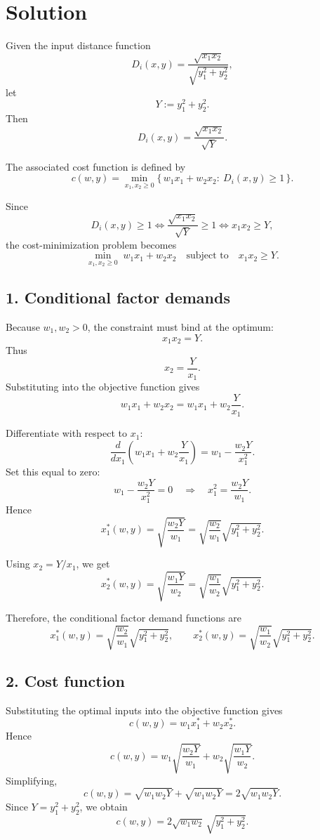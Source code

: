 \vspace{30pt}


\section*{Solution}

Given the input distance function
\[
D_i(x,y)=\frac{\sqrt{x_1x_2}}{\sqrt{y_1^2+y_2^2}},
\]
let
\[
Y:=y_1^2+y_2^2.
\]
Then
\[
D_i(x,y)=\frac{\sqrt{x_1x_2}}{\sqrt{Y}}.
\]

The associated cost function is defined by
\[
c(w,y)=\min_{x_1,x_2\ge 0}\{\,w_1x_1+w_2x_2:\ D_i(x,y)\ge 1\,\}.
\]

Since
\[
D_i(x,y)\ge 1
\iff
\frac{\sqrt{x_1x_2}}{\sqrt{Y}}\ge 1
\iff
x_1x_2\ge Y,
\]
the cost-minimization problem becomes
\[
\min_{x_1,x_2\ge 0}\; w_1x_1+w_2x_2
\quad \text{subject to} \quad
x_1x_2\ge Y.
\]

\subsection*{1. Conditional factor demands}

Because \(w_1,w_2>0\), the constraint must bind at the optimum:
\[
x_1x_2=Y.
\]
Thus
\[
x_2=\frac{Y}{x_1}.
\]
Substituting into the objective function gives
\[
w_1x_1+w_2x_2
=
w_1x_1+w_2\frac{Y}{x_1}.
\]

Differentiate with respect to \(x_1\):
\[
\frac{d}{dx_1}\left(w_1x_1+w_2\frac{Y}{x_1}\right)
=
w_1-\frac{w_2Y}{x_1^2}.
\]
Set this equal to zero:
\[
w_1-\frac{w_2Y}{x_1^2}=0
\quad \Rightarrow \quad
x_1^2=\frac{w_2Y}{w_1}.
\]
Hence
\[
x_1^*(w,y)=\sqrt{\frac{w_2Y}{w_1}}
=
\sqrt{\frac{w_2}{w_1}}\sqrt{y_1^2+y_2^2}.
\]

Using \(x_2=Y/x_1\), we get
\[
x_2^*(w,y)=\sqrt{\frac{w_1Y}{w_2}}
=
\sqrt{\frac{w_1}{w_2}}\sqrt{y_1^2+y_2^2}.
\]

Therefore, the conditional factor demand functions are
\[
\boxed{
x_1^*(w,y)=\sqrt{\frac{w_2}{w_1}}\sqrt{y_1^2+y_2^2},
\qquad
x_2^*(w,y)=\sqrt{\frac{w_1}{w_2}}\sqrt{y_1^2+y_2^2}.
}
\]

\subsection*{2. Cost function}

Substituting the optimal inputs into the objective function gives
\[
c(w,y)
=
w_1x_1^*+w_2x_2^*.
\]
Hence
\[
c(w,y)
=
w_1\sqrt{\frac{w_2Y}{w_1}}
+
w_2\sqrt{\frac{w_1Y}{w_2}}.
\]
Simplifying,
\[
c(w,y)
=
\sqrt{w_1w_2Y}+\sqrt{w_1w_2Y}
=
2\sqrt{w_1w_2Y}.
\]
Since \(Y=y_1^2+y_2^2\), we obtain
\[
\boxed{
c(w,y)=2\sqrt{w_1w_2}\,\sqrt{y_1^2+y_2^2}.
}
\]

